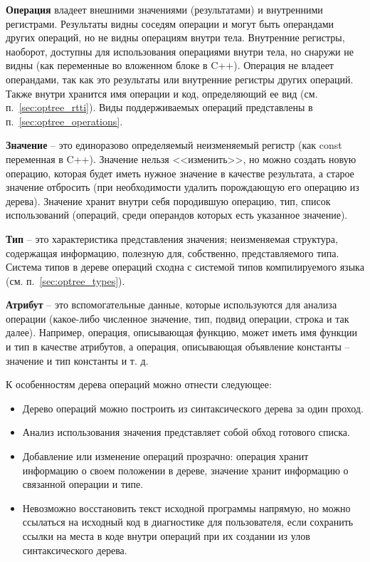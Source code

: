 \textbf{Операция} владеет внешними значениями (результатами) и внутренними регистрами.
Результаты видны соседям операции и могут быть операндами других операций, но не видны операциям внутри тела.
Внутренние регистры, наоборот, доступны для использования операциями внутри тела, но снаружи не видны (как переменные во вложенном блоке в C++).
Операция не владеет операндами, так как это результаты или внутренние регистры других операций.
Также внутри хранится имя операции и код, определяющий ее вид (см. п.~\ref{sec:optree_rtti}).
Виды поддерживаемых операций представлены в п.~\ref{sec:optree_operations}.

\textbf{Значение} -- это единоразово определяемый неизменяемый регистр (как const переменная в C++).
Значение нельзя <<изменить>>, но можно создать новую операцию, которая будет иметь нужное значение в качестве результата, а старое значение отбросить (при необходимости удалить порождающую его операцию из дерева).
Значение хранит внутри себя породившую операцию, тип, список использований (операций, среди операндов которых есть указанное значение).

\textbf{Тип} -- это характеристика представления значения; неизменяемая структура, содержащая информацию, полезную для, собственно, представляемого типа.
Система типов в дереве операций сходна с системой типов компилируемого языка (см. п.~\ref{sec:optree_types}).

\textbf{Атрибут} -- это вспомогательные данные, которые используются для анализа операции (какое-либо численное значение, тип, подвид операции, строка и так далее).
Например, операция, описывающая функцию, может иметь имя функции и тип в качестве атрибутов, а операция, описывающая объявление константы -- значение и тип константы и т. д.

К особенностям дерева операций можно отнести следующее:

\begin{itemize}
    \item Дерево операций можно построить из синтаксического дерева за один проход.
    \item Анализ использования значения представляет собой обход готового списка.
    \item Добавление или изменение операций прозрачно: операция хранит информацию о своем положении в дереве, значение хранит информацию о связанной операции и типе.
    \item Невозможно восстановить текст исходной программы напрямую, но можно ссылаться на исходный код в диагностике для пользователя, если сохранить ссылки на места в коде внутри операций при их создании из улов синтаксического дерева.
\end{itemize}

